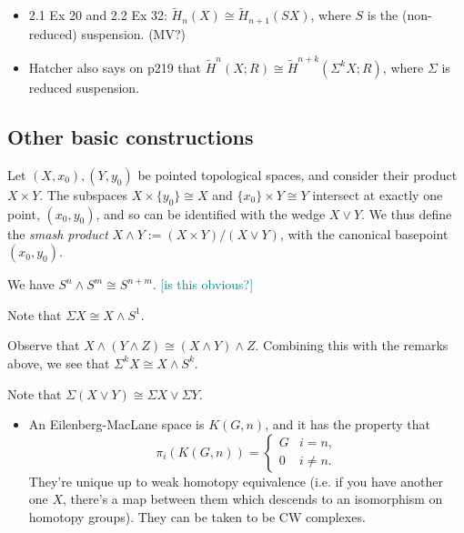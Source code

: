 \documentclass{MetricNotes2023}
\def\textcolour{\textcolor}
\begin{document}
\begin{itemize}
\item \autocite{hatcher} 2.1 Ex 20 and 2.2 Ex 32: \(\widetilde H_n(X)\cong \widetilde H_{n+1}(SX)\), where \(S\) is the (non-reduced) suspension.  (MV?) 
\item Hatcher also says on p219 that \(\widetilde H^n(X;R)\cong \widetilde H^{n+k}(\Sigma^kX;R)\), where \(\Sigma \) is reduced suspension.
\end{itemize}

\subsection{Other basic constructions}

\begin{definition}
Let \((X, x_0), (Y, y_0)\) be pointed topological spaces, and consider their product \(X\times Y\). The subspaces \(X\times\{y_0\}\cong X\) and \(\{x_0\}\times Y\cong Y\) intersect at exactly one point, \((x_0, y_0)\), and so can be identified with the wedge \(X\vee Y\). We thus define the \textit{smash product} \(X\wedge Y:=(X\times Y)/(X\vee Y)\), with the canonical basepoint \((x_0,y_0)\).  
\end{definition}

\begin{example}
We have \(S^n \wedge S^m\cong S^{n+m}\). \textcolour{teal}{[is this obvious?]}
\end{example}

\begin{remark}
Note that \(\Sigma X \cong X\wedge S^1\). 
\end{remark}

\begin{remark}\label{2503311142}
Observe that \(X\wedge (Y\wedge Z)\cong (X\wedge Y)\wedge Z\). Combining this with the remarks above, we see that \(\Sigma^kX\cong X\wedge S^k\). 
\end{remark}

\begin{remark}\label{2502211505}
Note that \(\Sigma(X\vee Y)\cong \Sigma X\vee \Sigma Y\).
\end{remark}

\begin{itemize}
\item An Eilenberg-MacLane space is \(K(G, n)\), and it has the property that 
\[\pi_i(K(G, n))=\begin{cases}
G & i=n,\\
0 & i\neq n.
\end{cases}\]
They're unique up to weak homotopy equivalence (i.e. if you have another one \(X\), there's a map between them which descends to an isomorphism on homotopy groups). They can be taken to be CW complexes. 
\end{itemize}
\end{document}
